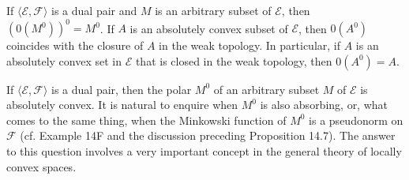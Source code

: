 If $\langle \mathcal{E}, \mathcal{F} \rangle$ is a dual pair and $M$ is an arbitrary subset of $\mathcal{E}$, then $(0(M^0))^0 = M^0$. If $A$ is an absolutely convex subset of $\mathcal{E}$, then $0(A^0)$ coincides with the closure of $A$ in the weak topology. In particular, if $A$ is an absolutely convex set in $\mathcal{E}$ that is closed in the weak topology, then $0(A^0) = A$.

If $\langle \mathcal{E}, \mathcal{F} \rangle$ is a dual pair, then the polar $M^0$ of an arbitrary subset $M$ of $\mathcal{E}$ is absolutely convex. It is natural to enquire when $M^0$ is also absorbing, or, what comes to the same thing, when the Minkowski function of $M^0$ is a pseudonorm on $\mathcal{F}$ (cf. Example 14F and the discussion preceding Proposition 14.7). The answer to this question involves a very important concept in the general theory of locally convex spaces.
